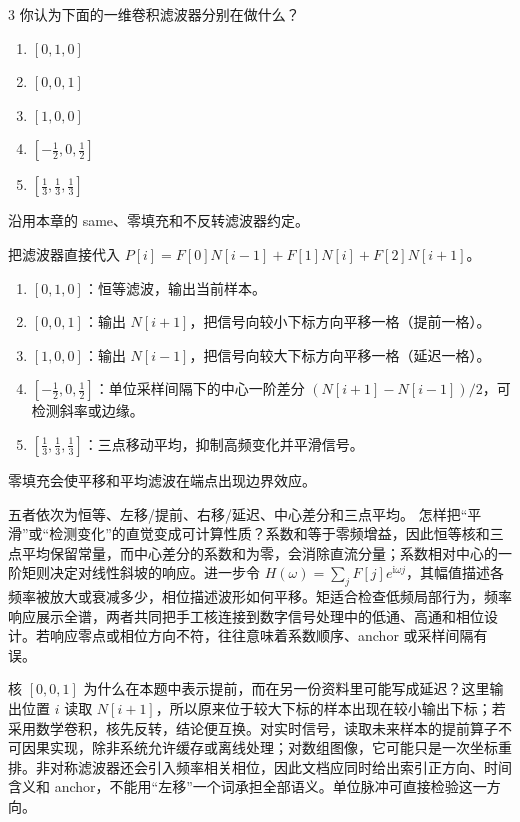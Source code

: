 \begin{solutionexercise}{3}
\problemheading 你认为下面的一维卷积滤波器分别在做什么？
\begin{enumerate}[label=\alph*.,leftmargin=2.2em]
  \item $[0,1,0]$
  \item $[0,0,1]$
  \item $[1,0,0]$
  \item $\left[-\frac12,0,\frac12\right]$
  \item $\left[\frac13,\frac13,\frac13\right]$
\end{enumerate}
沿用本章的 same、零填充和不反转滤波器约定。

\approachheading 把滤波器直接代入
$P[i]=F[0]N[i-1]+F[1]N[i]+F[2]N[i+1]$。

\answerheading
\begin{enumerate}[label=\alph*.,leftmargin=2.2em]
\item $[0,1,0]$：恒等滤波，输出当前样本。
\item $[0,0,1]$：输出 $N[i+1]$，把信号向较小下标方向平移一格（提前一格）。
\item $[1,0,0]$：输出 $N[i-1]$，把信号向较大下标方向平移一格（延迟一格）。
\item $[-\tfrac12,0,\tfrac12]$：单位采样间隔下的中心一阶差分
$(N[i+1]-N[i-1])/2$，可检测斜率或边缘。
\item $[\tfrac13,\tfrac13,\tfrac13]$：三点移动平均，抑制高频变化并平滑信号。
\end{enumerate}
零填充会使平移和平均滤波在端点出现边界效应。

\conclusionheading 五者依次为恒等、左移/提前、右移/延迟、中心差分和三点平均。
\discussionheading
{}
怎样把“平滑”或“检测变化”的直觉变成可计算性质？系数和等于零频增益，因此恒等核和三点平均保留常量，而中心差分的系数和为零，会消除直流分量；系数相对中心的一阶矩则决定对线性斜坡的响应。进一步令 $H(\omega)=\sum_jF[j]e^{\mathrm{i}\omega j}$，其幅值描述各频率被放大或衰减多少，相位描述波形如何平移。矩适合检查低频局部行为，频率响应展示全谱，两者共同把手工核连接到数字信号处理中的低通、高通和相位设计。若响应零点或相位方向不符，往往意味着系数顺序、anchor 或采样间隔有误。

核 $[0,0,1]$ 为什么在本题中表示提前，而在另一份资料里可能写成延迟？这里输出位置 $i$ 读取 $N[i+1]$，所以原来位于较大下标的样本出现在较小输出下标；若采用数学卷积，核先反转，结论便互换。对实时信号，读取未来样本的提前算子不可因果实现，除非系统允许缓存或离线处理；对数组图像，它可能只是一次坐标重排。非对称滤波器还会引入频率相关相位，因此文档应同时给出索引正方向、时间含义和 anchor，不能用“左移”一个词承担全部语义。单位脉冲可直接检验这一方向。


\end{solutionexercise}
